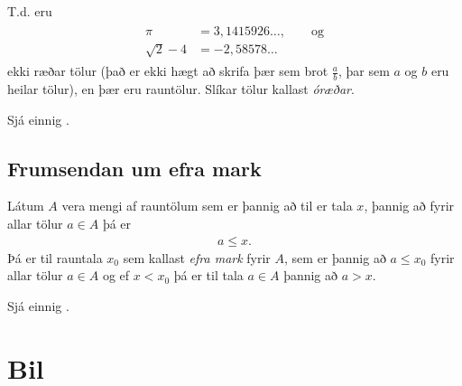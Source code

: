 \documentclass[a4paper,10pt,icelandic]{sphinxmanual}
\begin{document}
T.d. eru
\begin{equation*}
\begin{split}\begin{aligned}
\pi &= 3,1415926\ldots, \qquad \text{og}\\
\sqrt 2 -4  &= -2,58578\ldots\end{aligned}\end{split}
\end{equation*}
ekki ræðar tölur (það er ekki hægt að skrifa þær sem brot
\(\frac ab\), þar sem \(a\) og \(b\) eru heilar tölur), en
þær eru rauntölur. Slíkar tölur kallast \textit{óræðar}.

Sjá einnig .

\ignorespaces 

\subsection{Frumsendan um efra mark}
\label{\detokenize{kafli01:frumsendan-um-efra-mark}}\label{\detokenize{kafli01:frumsendanumeframark}}\label{\detokenize{kafli01:index-1}}
Látum \(A\) vera mengi af rauntölum sem
er þannig að til er tala \(x\), þannig að fyrir allar tölur
\(a \in A\) þá er
\begin{equation*}
\begin{split}a\leq x.\end{split}
\end{equation*}
Þá er til rauntala \(x_0\) sem kallast \textit{efra mark} fyrir
\(A\), sem er þannig að \(a\leq x_0\) fyrir allar tölur
\(a\in
A\) og ef \(x<x_0\) þá er til tala \(a\in A\) þannig að
\(a>x\).

Sjá einnig .


\section{Bil}
\label{\detokenize{kafli01:bil}}\label{\detokenize{kafli01:skilgreining-1-3-1}}
\ignorespaces 
\end{document}
